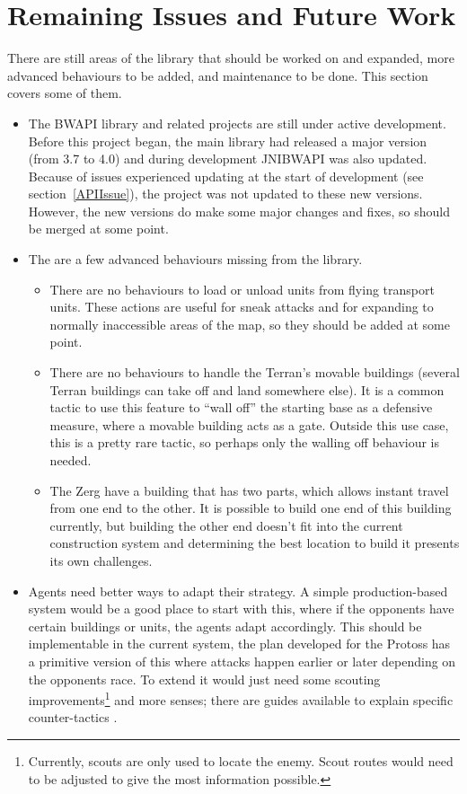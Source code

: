 \documentclass[11pt,openright,a4paper]{report}
\begin{document}
\section{Remaining Issues and Future Work}
There are still areas of the library that should be worked on and expanded, more advanced behaviours to be added, and maintenance to be done. This section covers some of them.

\begin{itemize}
\item{The BWAPI library and related projects are still under active development. Before this project began, the main library had released a major version (from 3.7 to 4.0) and during development JNIBWAPI was also updated. Because of issues experienced updating at the start of development (see section~\ref{APIIssue}), the project was not updated to these new versions. However, the new versions do make some major changes and fixes, so should be merged at some point.}
\item{The are a few advanced behaviours missing from the library.
    \begin{itemize}
        \item{There are no behaviours to load or unload units from flying transport units. These actions are useful for sneak attacks and for expanding to normally inaccessible areas of the map, so they should be added at some point.}
        \item{There are no behaviours to handle the Terran's movable buildings (several Terran buildings can take off and land somewhere else). It is a common tactic to use this feature to ``wall off'' the starting base as a defensive measure, where a movable building acts as a gate. Outside this use case, this is a pretty rare tactic, so perhaps only the walling off behaviour is needed.}
        \item{The Zerg have a building that has two parts, which allows instant travel from one end to the other. It is possible to build one end of this building currently, but building the other end doesn't fit into the current construction system and determining the best location to build it presents its own challenges.}
    \end{itemize}}
\item{Agents need better ways to adapt their strategy. A simple production-based system would be a good place to start with this, where if the opponents have certain buildings or units, the agents adapt accordingly. This should be implementable in the current system, the plan developed for the Protoss has a primitive version of this where attacks happen earlier or later depending on the opponents race. To extend it would just need some scouting improvements\footnote{Currently, scouts are only used to locate the enemy. Scout routes would need to be adjusted to give the most information possible.} and more senses; there are guides available to explain specific counter-tactics \cite{StratWiki}.}

\end{itemize}
\end{document}
